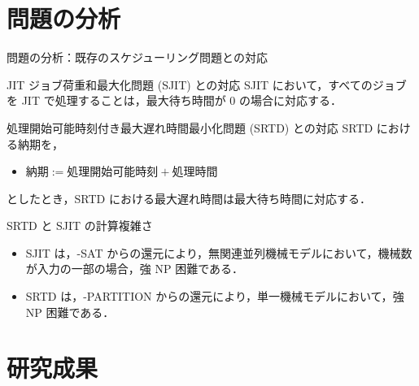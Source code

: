 \documentclass[dvipdfmx]{beamer}
\begin{document}
    \section{問題の分析}
    \begin{frame}{問題の分析：既存のスケジューリング問題との対応}

      \begin{block}{JIT ジョブ荷重和最大化問題 (SJIT) との対応}
        SJIT において，すべてのジョブを JIT で処理することは，最大待ち時間が $0$ の場合に対応する．
      \end{block}

      \begin{block}{処理開始可能時刻付き最大遅れ時間最小化問題 (SRTD) との対応}
        SRTD における納期を，
        \begin{itemize}
          \item $\text{納期} := \text{処理開始可能時刻} + \text{処理時間}$
        \end{itemize}
        としたとき，SRTD における最大遅れ時間は最大待ち時間に対応する．
      \end{block}

      \begin{block}{SRTD と SJIT の計算複雑さ}
        \begin{itemize}
          \item SJIT は，{-SAT} からの還元により，無関連並列機械モデルにおいて，機械数が入力の一部の場合，\alert{強 NP 困難}である．
          \item SRTD は，{-PARTITION} からの還元により，単一機械モデルにおいて，\alert{強 NP  困難}である．
        \end{itemize}
      \end{block}
    \end{frame}
    \section{研究成果}
\end{document}
